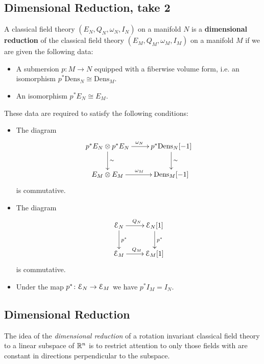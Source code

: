 \documentclass[10pt, oneside]{article}
\newcommand{\Dens}{\mathrm{Dens}}
\begin{document}
\subsection{Dimensional Reduction, take 2}

\begin{definition}
A classical field theory $(E_N, Q_N, \omega_N, I_N)$ on a manifold $N$ is a {\bf dimensional reduction} of the classical field theory $(E_M, Q_M, \omega_M, I_M)$ on a manifold $M$ if we are given the following data:
\begin{itemize}
\item A submersion $p\colon M\rightarrow N$ equipped with a fiberwise volume form, i.e. an isomorphism $p^*\Dens_N\cong \Dens_M$.

\item An isomorphism $p^* E_N\cong E_M$.
\end{itemize}
These data are required to satisfy the following conditions:
\begin{itemize}
\item The diagram
\[
\xymatrix{
p^* E_N\otimes p^* E_N \ar^{\omega_N}[r] \ar^{\sim}[d] & p^*\Dens_N[-1] \ar^{\sim}[d] \\
E_M\otimes E_M \ar^{\omega_M}[r] & \Dens_M[-1]
}
\]
is commutative.

\item The diagram
\[
\xymatrix{
\cE_N \ar^{Q_N}[r] \ar^{p^*}[d] & \cE_N[1] \ar^{p^*}[d] \\
\cE_M \ar^{Q_M}[r] & \cE_M[1]
}
\]
is commutative.

\item Under the map $p^*\colon \mathcal E_N\rightarrow \mathcal E_M$ we have $p^* I_M = I_N$.
\end{itemize}
\end{definition}

\subsection{Dimensional Reduction} \label{dim_red_section}
The idea of the \emph{dimensional reduction} of a rotation invariant classical field theory to a linear subspace of $\mathbb R^n$ is to restrict attention to only those fields with are constant in directions perpendicular to the subspace. 
\end{document}
